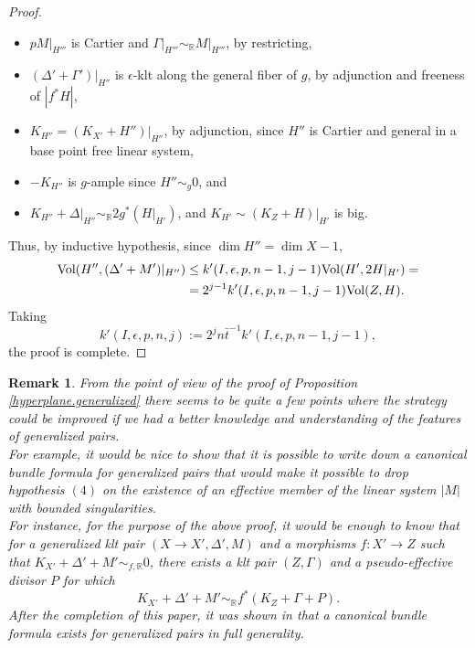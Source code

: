 \documentclass{amsart}[12pt,a4paper]
\newtheorem{remark}[theorem]{Remark}
\theoremstyle{definition}
\newcommand{\rr}{\mathbb{R}}
\begin{document}
\begin{proof}
\begin{itemize}
the coefficients of $\Delta'\vert_{H''}$ are in $I$ which is DCC, by adjunction and freeness of $|g^\ast H|$,
\item
$pM\vert_{H'''}$ is Cartier and $\Gamma\vert_{H'''}\sim_\mathbb{R} M\vert_{H'''}$, by restricting,
\item 
$(\Delta'+\Gamma')|_{H''}$ is $\epsilon$-klt along the general fiber of $g$, by adjunction and freeness of $|f^\ast H|$,
\item 
$K_{H''}= (K_{X'}+H'')\vert_{H''}$, by adjunction, since $H''$ is Cartier and general in a base point free linear system,
\item 
$-K_{H''}$ is $g$-ample since $H'' \sim_{g} 0$, and 
\item 
$K_{H''}+\Delta|_{H''}\sim_{\mathbb{R}}2g^*(H|_{H'})$, and $K_{H'} \sim (K_Z+H)|_{H'}$ is big.
\end{itemize}
Thus, by inductive hypothesis, since $\dim H'' =\dim X -1$,
\begin{eqnarray*}
{\rm Vol}(H'',(\Delta'+M')|_{H''}) & \leq k'(I,\epsilon, p, n-1, j-1){\rm Vol}(H',2H|_{H'})=\\
&=2^{j-1}k'(I, \epsilon, p, n-1, j-1){\rm Vol}(Z,H).
\end{eqnarray*}
\noindent
Taking \[
k'(I,\epsilon, p, n,j):=2^{j}n \bar{t}^{-1} k'(I,\epsilon, p, n-1, j-1),
\] 
the proof is complete.
\end{proof}

\begin{remark}
  From the point of view of the proof of Proposition \ref{hyperplane.generalized} there seems to be quite a few points where the strategy could be improved if we had a better knowledge and understanding of the features of generalized pairs.
\\
For example, it would be nice to show that it is possible to write down a canonical bundle formula for generalized pairs that would make it possible to drop hypothesis $(4)$ on the existence of an effective member of the linear system $|M|$ with bounded singularities.
 \\
For instance, for the purpose of the above proof, it would be enough to know that for a generalized klt pair $(X \to X', \Delta', M)$ and a morphisms $f \colon X' \to Z$ such that $K_{X'}+\Delta'+M' \sim_{f, \rr} 0$, there exists a klt pair $(Z, \Gamma)$ and a pseudo-effective divisor $P$ for which
\[
K_{X'}+\Delta'+M' \sim_{\rr} f^\ast(K_Z+ \Gamma+P).
\]
After the completion of this paper, it was shown in \cite{Fil18a, HL} that a canonical bundle formula exists for generalized pairs in full generality.
\end{remark}
\end{document}
